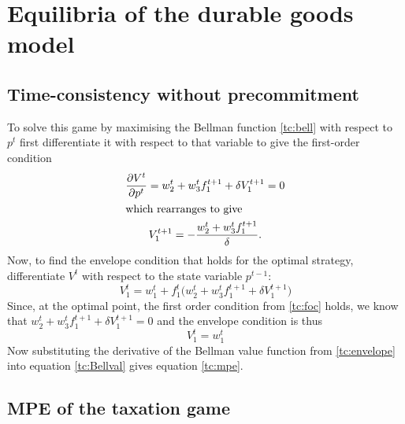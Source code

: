 \chapter[Durable equilibria]{Equilibria of the durable goods model}
\label{cha:equil-durable-goods}

\section{Time-consistency without precommitment}
\label{sec:time-cons-equil}
To solve this game by maximising the Bellman function
\eqref{tc:bell} with respect to $p^t$ first differentiate it with
respect to that variable to give the first-order condition
\begin{gather}  \label{tc:foc}
    \frac{\partial V^t}{\partial p^t} = w^t_2 + w^t_3 f^{t+1}_1 + \delta V^{t+1}_1 = 0 \\
    \intertext{which rearranges to give} \label{tc:Bellval}
    V^{t+1}_1 = - \frac{w^t_2 + w^t_3 f^{t+1}_1}{\delta}.
\end{gather}
Now, to find the envelope condition that holds for the optimal
strategy, differentiate $V^t$ with respect to the state variable
$p^{t-1}$:
\begin{equation}
    V^t_1 = w^t_1 + f^t_1 \bigl( w^t_2  + w^t_3 f^{t+1}_1 + \delta
    V^{t+1}_1 \bigr)
\end{equation}
Since, at the optimal point, the first order condition from
\eqref{tc:foc} holds, we know that $w^t_2 + w^t_3 f^{t+1}_1 + \delta
V^{t+1}_1 = 0$ and the envelope condition is thus
\begin{equation}    \label{tc:envelope}
    V^t_1 = w^t_1
\end{equation}
Now substituting the derivative of the Bellman value function from
\eqref{tc:envelope} into equation \eqref{tc:Bellval} gives equation
\eqref{tc:mpe}.


\section{MPE of the taxation game}
\label{sec:mpe-taxation-game}
